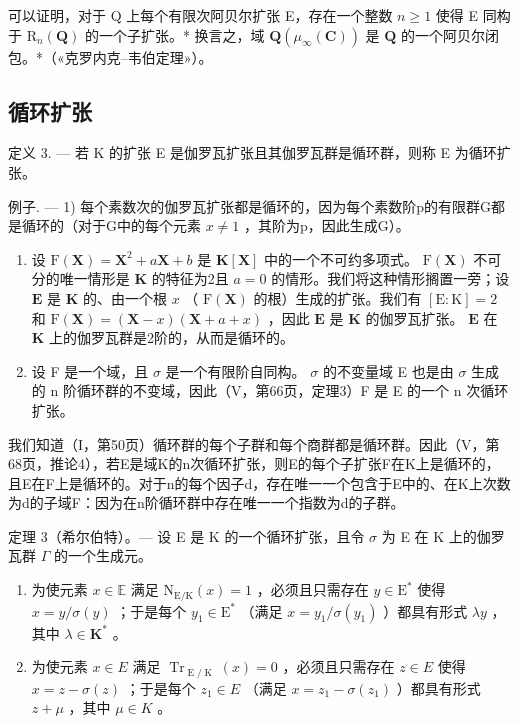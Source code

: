 可以证明，对于 Q 上每个有限次阿贝尔扩张 E，存在一个整数 \(n \geqslant 1\) 使得 E 同构于 \(\mathrm{R}_{n}(\mathbf{Q})\) 的一个子扩张。* 换言之，域 \(\mathbf{Q}(\mu_{\infty}(\mathbf{C}))\) 是 \(\mathbf{Q}\) 的一个阿贝尔闭包。*（«克罗内克–韦伯定理»）。

\subsection{循环扩张}

定义 3. --- 若 K 的扩张 E 是伽罗瓦扩张且其伽罗瓦群是循环群，则称 E 为循环扩张。

例子. --- 1) 每个素数次的伽罗瓦扩张都是循环的，因为每个素数阶p的有限群G都是循环的（对于G中的每个元素 \(x \neq 1\) ，其阶为p，因此生成G）。

\begin{enumerate}
\def\labelenumi{\arabic{enumi})}
\setcounter{enumi}{1}
\item
  设 \(\mathrm{F}(\mathbf{X}) = \mathbf{X}^2 + a\mathbf{X} + b\) 是 \(\mathbf{K}[\mathbf{X}]\) 中的一个不可约多项式。 \(\mathrm{F}(\mathbf{X})\) 不可分的唯一情形是 \(\mathbf{K}\) 的特征为2且 \(a = 0\) 的情形。我们将这种情形搁置一旁；设 \(\mathbf{E}\) 是 \(\mathbf{K}\) 的、由一个根 \(x\) （ \(\mathrm{F}(\mathbf{X})\) 的根）生成的扩张。我们有 \([\mathrm{E}:\mathrm{K}] = 2\) 和 \(\mathrm{F}(\mathbf{X}) = (\mathbf{X} - x)(\mathbf{X} + a + x)\) ，因此 \(\mathbf{E}\) 是 \(\mathbf{K}\) 的伽罗瓦扩张。 \(\mathbf{E}\) 在 \(\mathbf{K}\) 上的伽罗瓦群是2阶的，从而是循环的。
\item
  设 F 是一个域，且 \(\sigma\) 是一个有限阶自同构。 \(\sigma\) 的不变量域 E 也是由 \(\sigma\) 生成的 n 阶循环群的不变域，因此（V，第66页，定理3）F 是 E 的一个 n 次循环扩张。
\end{enumerate}

我们知道（I，第50页）循环群的每个子群和每个商群都是循环群。因此（V，第68页，推论4），若E是域K的n次循环扩张，则E的每个子扩张F在K上是循环的，且E在F上是循环的。对于n的每个因子d，存在唯一一个包含于E中的、在K上次数为d的子域F：因为在n阶循环群中存在唯一一个指数为d的子群。

定理 3（希尔伯特）。--- 设 E 是 K 的一个循环扩张，且令 \(\sigma\) 为 E 在 K 上的伽罗瓦群 \(\Gamma\) 的一个生成元。

\begin{enumerate}
\def\labelenumi{\alph{enumi})}
\item
  为使元素 \(x \in \mathbb{E}\) 满足 \(\mathrm{N}_{\mathrm{E} / \mathrm{K}}(x) = 1\) ，必须且只需存在 \(y \in \mathrm{E}^*\) 使得 \(x = y / \sigma(y)\) ；于是每个 \(y_1 \in \mathrm{E}^*\) （满足 \(x = y_1 / \sigma(y_1)\) ）都具有形式 \(\lambda y\) ，其中 \(\lambda \in \mathbf{K}^*\) 。
\item
  为使元素 \(x \in E\) 满足 \(\operatorname{Tr}_{\operatorname{E}/\operatorname{K}}(x) = 0\) ，必须且只需存在 \(z \in E\) 使得 \(x = z - \sigma(z)\) ；于是每个 \(z_{1} \in E\) （满足 \(x = z_{1} - \sigma(z_{1})\) ）都具有形式 \(z + \mu\) ，其中 \(\mu \in K\) 。
\end{enumerate}


